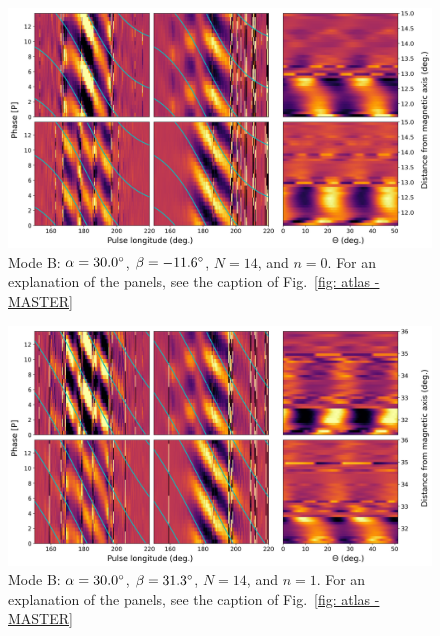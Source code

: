 \begin{figure}
	\begin{center}
		\includegraphics[width=\atlasHeightFrac\textwidth]{Figures/B0031/atlas/B_517030014000_plots}
		\caption[Atlas results: Mode B -- $\alpha=30.0\degr$, $\beta=-11.6\degr$, $N=14$, $n=0$]{Mode B: $\alpha=30.0\degr$, $\beta=-11.6\degr$, $N=14$, and $n=0$. For an explanation of the panels, see the caption of Fig.~\ref{fig: atlas - MASTER} }
		\label{fig: atlas - B_517030014000}
	\end{center}
\end{figure}

\begin{figure}
	\begin{center}
		\includegraphics[width=\atlasHeightFrac\textwidth]{Figures/B0031/atlas/B_517030014001_plots}
		\caption[Atlas results: Mode B -- $\alpha=30.0\degr$, $\beta=31.3\degr$, $N=14$, $n=1$]{Mode B: $\alpha=30.0\degr$, $\beta=31.3\degr$, $N=14$, and $n=1$. For an explanation of the panels, see the caption of Fig.~\ref{fig: atlas - MASTER} }
		\label{fig: atlas - B_517030014001}
	\end{center}
\end{figure}

